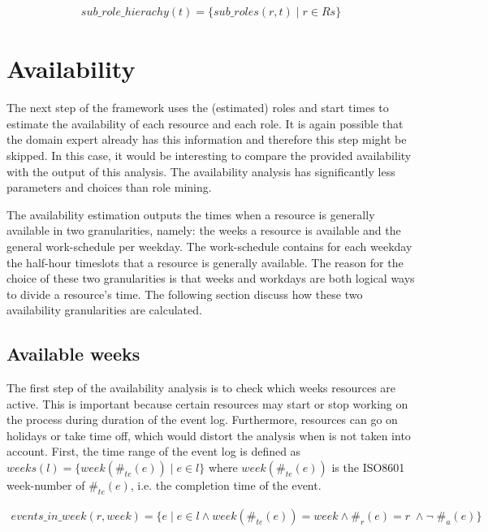 \begin{equation}\label{def:sub_roles_hierachy}
  \begin{array}{l}
    sub\_role\_hierachy(t) = \{sub\_roles(r, t) \; |\; r \in Rs\}
  \end{array}
\end{equation} 


\section{Availability}
The next step of the framework uses the (estimated) roles and start times to estimate the availability of each resource and each role. It is again possible that the domain expert already has this information and therefore this step might be skipped. In this case, it would be interesting to compare the provided availability with the output of this analysis. The availability analysis has significantly less parameters and choices than role mining.

The availability estimation outputs the times when a resource is generally available in two granularities, namely: the weeks a resource is available and the general work-schedule per weekday. The work-schedule contains for each weekday the half-hour timeslots that a resource is generally available. The reason for the choice of these two granularities is that weeks and workdays are both logical ways to divide a resource's time. The following section discuss how these two availability granularities are calculated.  

\subsection{Available weeks}
The first step of the availability analysis is to check which weeks resources are active. This is important because certain resources may start or stop working on the process during duration of the event log. Furthermore, resources can go on holidays or take time off, which would distort the analysis when is not taken into account. First, the time range of the event log is defined as $weeks(l)=\{ week(\#_{te}(e)) \; | \; e \in l \}$ where $week(\#_{te}(e))$ is the ISO8601 week-number \cite{iso8601} of $\#_{te}(e)$, i.e. the completion time of the event. 

\begin{equation}\label{def:events_per_week}
  \begin{array}{l}
    events\_in\_week(r, week) = \{ e \; | \; e \in l \wedge week(\#_{te}(e)) = week \wedge \#_{r}(e) = r \; \wedge \neg \; \#_{a}(e)\}
  \end{array}
\end{equation}

